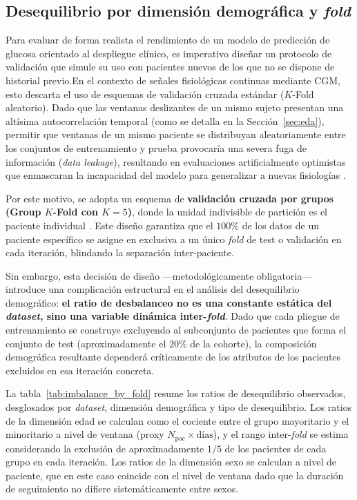 \subsection{Desequilibrio por dimensión demográfica y \textit{fold}}
\label{subsec:imbalance_por_fold}

Para evaluar de forma realista el rendimiento de un modelo de predicción de glucosa
orientado al despliegue clínico, es imperativo diseñar un protocolo de validación que
simule su uso con pacientes nuevos de los que no se dispone de historial previo.En el contexto de señales fisiológicas
continuas mediante CGM, esto descarta el uso de esquemas de validación cruzada estándar
($K$-Fold aleatorio). Dado que las ventanas deslizantes de un mismo sujeto presentan una
altísima autocorrelación temporal (como se detalla en la Sección~\ref{sec:eda}),
permitir que ventanas de un mismo paciente se distribuyan aleatoriamente entre los conjuntos
de entrenamiento y prueba provocaría una severa fuga de información (\textit{data leakage}),
resultando en evaluaciones artificialmente optimistas que enmascaran la incapacidad del
modelo para generalizar a nuevas fisiologías .

Por este motivo, se adopta un esquema de \textbf{validación cruzada por grupos
(Group $K$-Fold con $K=5$)}, donde la unidad indivisible de partición es el paciente
individual \cite{antoniotfg}. Este diseño garantiza que el $100\%$ de
los datos de un paciente específico se asigne en exclusiva a un único \textit{fold} de
test o validación en cada iteración, blindando la separación inter-paciente.

Sin embargo, esta decisión de diseño ---metodológicamente obligatoria--- introduce una
complicación estructural en el análisis del desequilibrio demográfico: \textbf{el ratio
de desbalanceo no es una constante estática del \textit{dataset}, sino una variable
dinámica inter-\textit{fold}}. Dado que cada pliegue de entrenamiento se construye
excluyendo al subconjunto de pacientes que forma el conjunto de test (aproximadamente
el $20\%$ de la cohorte), la composición demográfica resultante dependerá críticamente
de los atributos de los pacientes excluidos en esa iteración concreta.

La tabla~\ref{tab:imbalance_by_fold} resume los ratios de desequilibrio observados,
desglosados por \textit{dataset}, dimensión demográfica y tipo de desequilibrio. Los
ratios de la dimensión edad se calculan como el cociente entre el grupo mayoritario y
el minoritario a nivel de ventana (proxy $N_{\text{pac}} \times \text{días}$), y el rango
inter-\textit{fold} se estima considerando la exclusión de aproximadamente $1/5$ de
los pacientes de cada grupo en cada iteración. Los ratios de la dimensión sexo se
calculan a nivel de paciente, que en este caso coincide con el nivel de ventana dado
que la duración de seguimiento no difiere sistemáticamente entre sexos.


